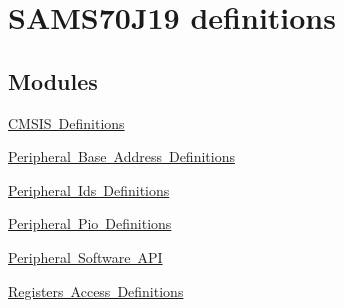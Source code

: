 \hypertarget{group__SAMS70J19__definitions}{}\section{S\+A\+M\+S70\+J19 definitions}
\label{group__SAMS70J19__definitions}
\subsection*{Modules}
\begin{DoxyCompactItemize}
\item 
\mbox{\hyperlink{group__SAMS70J19__cmsis}{C\+M\+S\+I\+S Definitions}}
\item 
\mbox{\hyperlink{group__SAMS70J19__base}{Peripheral Base Address Definitions}}
\item 
\mbox{\hyperlink{group__SAMS70J19__id}{Peripheral Ids Definitions}}
\item 
\mbox{\hyperlink{group__SAMS70J19__pio}{Peripheral Pio Definitions}}
\item 
\mbox{\hyperlink{group__SAMS70J19__api}{Peripheral Software A\+PI}}
\item 
\mbox{\hyperlink{group__SAMS70J19__reg}{Registers Access Definitions}}
\end{DoxyCompactItemize}
